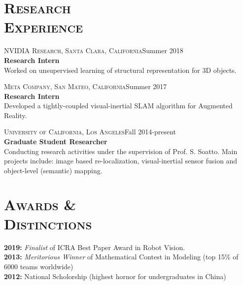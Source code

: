 \documentclass[margin, line, 10pt]{res} %
\begin{document}
\begin{resume}

\section{\textsc{Research\\Experience}}
\textsc{NVIDIA Research, Santa Clara, California}\hfill Summer 2018\\
\textbf{Research Intern}\\
Worked on unsupervised learning of structural representation for 3D objects.

\textsc{Meta Company, San Mateo, California}\hfill Summer 2017\\
\textbf{Research Intern}\\
Developed a tightly-coupled visual-inertial SLAM algorithm for Augmented Reality.

\textsc{University of California, Los Angeles}\hfill Fall 2014-present\\
\textbf{Graduate Student Researcher}\\
Conducting research activities under the supervision of Prof. S. Soatto. Main projects include: image based re-localization, visual-inertial sensor fusion and object-level (semantic) mapping.


\section{\textsc{Awards \&\\Distinctions}}
\textbf{2019:} \textit{Finalist} of ICRA Best Paper Award in Robot Vision.\\
\textbf{2013:} \textit{Meritorious Winner} of Mathematical Contest in Modeling (top 15\% of 6000 teams worldwide)\\
\textbf{2012:} National Scholorship (highest hornor for undergraduates in China)

\end{resume}
\end{document}
